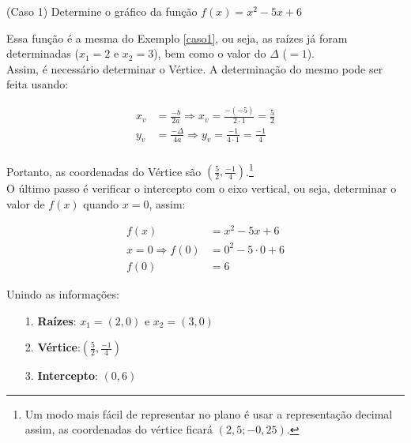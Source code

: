 \begin{example}
	(Caso 1) Determine o gráfico da função $f(x)=x^2-5x+6$
	
	\solucao
	
	Essa função é a mesma do Exemplo \ref{caso1}, ou seja, as raízes já foram determinadas ($x_1 = 2$ e $x_2 = 3$), bem como o valor do $\Delta$ ($= 1$).\\
	
	Assim, é necessário determinar o Vértice. A determinação do mesmo pode ser feita usando:
	
	\begin{ceqn}
		\begin{align*}
		x_v &= \frac{-b}{2a} \Rightarrow x_v = \frac{-(-5)}{2 \cdot 1} = \frac{5}{2} \\
		y_v &= \frac{-\Delta}{4a} \Rightarrow y_v = \frac{-1}{4 \cdot 1} = \frac{-1}{4} \\
		\end{align*}
	\end{ceqn}
	
	Portanto, as coordenadas do Vértice são $\left (\frac{5}{2},\frac{-1}{4} \right )$.\footnote{Um modo mais fácil de representar no plano é usar a representação decimal assim, as coordenadas do vértice ficará $(2,5;-0,25)$.}\\
	
	O último passo é verificar o intercepto com o eixo vertical, ou seja, determinar o valor de $f(x)$ quando $x=0$, assim:
	
	\begin{ceqn}
		\begin{align*}
		f(x) &= x^2-5x+6 \\
		x=0 \Rightarrow f(0)&=0^2-5 \cdot 0 +6 \\
		f(0) &= 6 
		\end{align*}
	\end{ceqn}
	
	Unindo as informações:\\
	\begin{itemize}
		\item[1.]{\textbf{Raízes}: $x_1=(2,0)$ e $x_2=(3,0)$}
		\item[2.]{\textbf{Vértice}:$\left( \frac{5}{2},\frac{-1}{4} \right)$}
		\item[3.]{\textbf{Intercepto}: $(0,6)$}\\
	\end{itemize}
	

\end{example}
